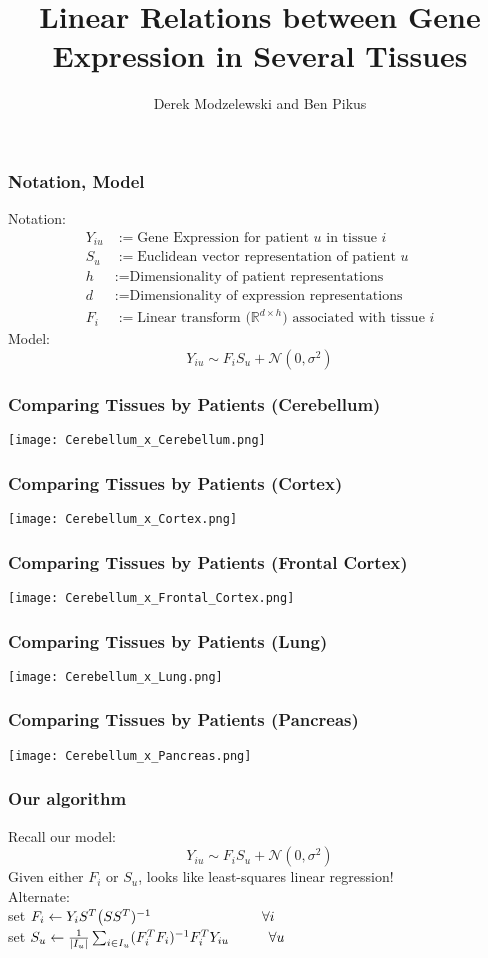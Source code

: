 \documentclass{beamer}
\title{Linear Relations between Gene Expression in Several Tissues}
\author{Derek Modzelewski and Ben Pikus}
\newcommand{\hs}[1]{\hspace*{#1 cm}}
\newcommand{\tx}[1]{\text{#1}}
\begin{document}
\frame{\titlepage}


\begin{frame}
\frametitle{Notation, Model}
Notation:
\begin{align*}
Y_{iu} &:= \tx{Gene Expression for patient $u$ in tissue $i$} \\
S_u &:= \tx{Euclidean vector representation of patient $u$} \\
h &:= \tx{Dimensionality of patient representations} \\
d &:= \tx{Dimensionality of expression representations} \\
F_i &:= \tx{Linear transform ($\mathbb{R}^{d \times h}$) associated with tissue $i$}
\end{align*}
Model:
\[ Y_{iu} \sim F_i S_u + \mathcal{N}(0, \sigma^2) \]
\end{frame}



\begin{frame} \frametitle{Comparing Tissues by Patients (Cerebellum)}
\texttt{[image: Cerebellum\_x\_Cerebellum.png]}
\end{frame}

\begin{frame} \frametitle{Comparing Tissues by Patients (Cortex)}
\texttt{[image: Cerebellum\_x\_Cortex.png]}
\end{frame}

\begin{frame} \frametitle{Comparing Tissues by Patients (Frontal Cortex)}
\texttt{[image: Cerebellum\_x\_Frontal\_Cortex.png]}
\end{frame}

\begin{frame} \frametitle{Comparing Tissues by Patients (Lung)}
\texttt{[image: Cerebellum\_x\_Lung.png]}
\end{frame}

\begin{frame} \frametitle{Comparing Tissues by Patients (Pancreas)}
\texttt{[image: Cerebellum\_x\_Pancreas.png]}
\end{frame}


\begin{frame} \frametitle{Our algorithm}
Recall our model:
\[ Y_{iu} \sim F_i S_u + \mathcal{N}(0, \sigma^2) \]
Given either $F_i$ or $S_u$, looks like least-squares linear regression! \\

Alternate: \\
\hs{1} set $F_i \leftarrow Y_i S^T\big(SS^T)^{-1} \hs{2.8}\forall i$ \\
\hs{1} set $S_u \leftarrow \frac{1}{|I_u|}\sum_{i \in I_u} (F_i^TF_i)^{-1}F_i^T Y_{iu} \hs{1}\forall u$
\end{frame}
\end{document}
